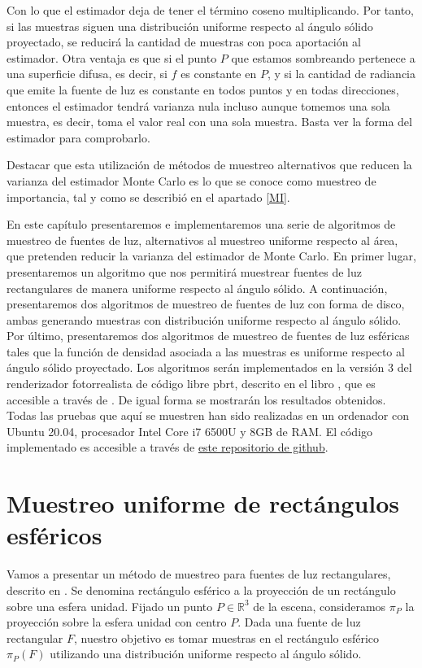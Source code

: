 Con lo que el estimador deja de tener el término coseno multiplicando. Por tanto, si las muestras siguen una distribución uniforme respecto al ángulo sólido proyectado, se reducirá la cantidad de muestras con poca aportación al estimador. Otra ventaja es que si el punto $P$ que estamos sombreando pertenece a una superficie difusa, es decir, si $f$ es constante en $P$, y si la cantidad de radiancia que emite la fuente de luz es constante en todos puntos y en todas direcciones, entonces el estimador tendrá varianza nula incluso aunque tomemos una sola muestra, es decir, toma el valor real con una sola muestra. Basta ver la forma del estimador para comprobarlo.

Destacar que esta utilización de métodos de muestreo alternativos que reducen la varianza del estimador Monte Carlo es lo que se conoce como muestreo de importancia, tal y como se describió en el apartado \ref{MI}. 

En este capítulo presentaremos e implementaremos una serie de algoritmos de muestreo de fuentes de luz, alternativos al muestreo uniforme respecto al área, que pretenden reducir la varianza del estimador de Monte Carlo. En primer lugar, presentaremos un algoritmo que nos permitirá muestrear fuentes de luz rectangulares de manera uniforme respecto al ángulo sólido. A continuación, presentaremos dos algoritmos de muestreo de fuentes de luz con forma de disco, ambas generando muestras con distribución uniforme respecto al ángulo sólido. Por último, presentaremos dos algoritmos de muestreo de fuentes de luz esféricas tales que la función de densidad asociada a las muestras es uniforme respecto al ángulo sólido proyectado. Los algoritmos serán implementados en la versión 3 del renderizador fotorrealista de código libre pbrt, descrito en el libro \cite{Pharr2016}, que es accesible a través de \cite{pbrtCode}. De igual forma se mostrarán los resultados obtenidos. Todas las pruebas que aquí se muestren han sido realizadas en un ordenador con Ubuntu 20.04, procesador Intel Core i7 6500U y 8GB de RAM. El código implementado es accesible a través de \href{https://github.com/emilio98/TFG}{este repositorio de github}.

\section{Muestreo uniforme de rectángulos esféricos}

Vamos a presentar un método de muestreo para fuentes de luz rectangulares, descrito en \cite{Urena2013}. Se denomina rectángulo esférico a la proyección de un rectángulo sobre una esfera unidad. Fijado un punto $P\in\mathds{R}^3$ de la escena, consideramos $\pi_P$ la proyección sobre la esfera unidad con centro $P$. Dada una fuente de luz rectangular $F$, nuestro objetivo es tomar muestras en el rectángulo esférico $\pi_P(F)$ utilizando una distribución uniforme respecto al ángulo sólido.

